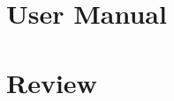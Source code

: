\documentclass[11pt]{article}
\begin{document}
\newpage

\section{User Manual}

\newpage

\section{Review}
\end{document}
